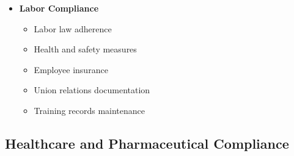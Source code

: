 \begin{tcolorbox}[
    colback=white,
    colframe=primarydark,
    title=\textbf{Manufacturing Standards and Requirements},
    before skip=1em,
    after skip=1em
]
\begin{itemize}[leftmargin=*,itemsep=0.5em]
        \vspace{0.5em}

        \item \textbf{Labor Compliance}
        \begin{itemize}[itemsep=0.3em]
            \item Labor law adherence
            \item Health and safety measures
            \item Employee insurance
            \item Union relations documentation
            \item Training records maintenance
        \end{itemize}
    \end{itemize}
\end{tcolorbox}

\subsection{Healthcare and Pharmaceutical Compliance}\label{subsec:healthcare-compliance}
\vspace{1em}

